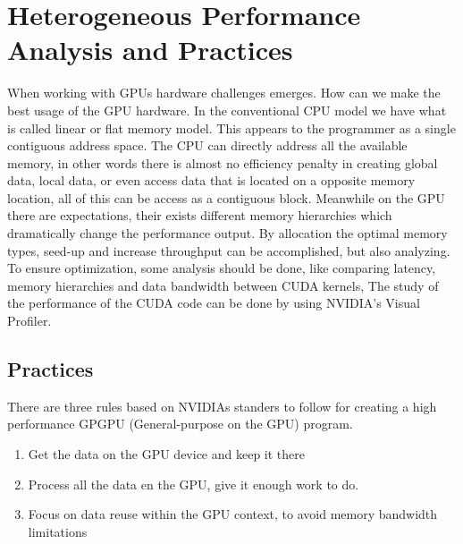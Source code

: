 
\chapter{Heterogeneous Performance Analysis and Practices} %

\label{Heterogeneous Performance Analysis and Practices} %



When working with GPUs hardware challenges emerges. How can we make the best usage of the GPU hardware. In the conventional CPU model we have what is called linear or flat memory model. This appears to the programmer as a single contiguous address space. The CPU can directly address all the available memory, in other words there is almost no efficiency penalty in creating global data, local data, or even access data that is located on a opposite memory location, all of this can be access as a contiguous block. \cite{cook} Meanwhile on the GPU there are expectations, their exists different memory hierarchies which dramatically change the performance output. By allocation the optimal memory types, seed-up and increase throughput can be accomplished, but also analyzing. To ensure optimization, some analysis should be done, like comparing latency, memory hierarchies and data bandwidth between CUDA kernels, The study of the performance of the CUDA code can be done by using NVIDIA's Visual Profiler.


\section{Practices}

There are three rules based on NVIDIAs standers to follow for creating a high performance GPGPU (General-purpose on the GPU) program.\cite{design}

\begin{enumerate}
  \item Get the data on the GPU device and keep it there
  \item Process all the data en the GPU, give it enough work to do.
  \item Focus on data reuse within the GPU context, to avoid memory bandwidth limitations
\end{enumerate}

